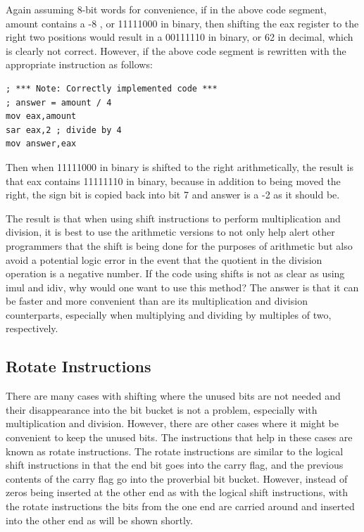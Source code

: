 \documentclass[10pt]{book}
\begin{document}
Again assuming 8-bit words for convenience, if in the above code segment, amount contains a -8 , or 11111000 in binary, then shifting the eax register to the right two positions would result in a 00111110 in binary, or 62 in decimal, which is clearly not correct. However, if the above code segment is rewritten with the appropriate instruction as follows:


\begin{verbatim}
; *** Note: Correctly implemented code ***
; answer = amount / 4
mov eax,amount
sar eax,2 ; divide by 4
mov answer,eax
\end{verbatim}

Then when 11111000 in binary is shifted to the right arithmetically, the result is that eax contains 11111110 in binary, because in addition to being moved the right, the sign bit is copied back into bit 7 and answer is a -2 as it should be.

The result is that when using shift instructions to perform multiplication and division, it is best to use the arithmetic versions to not only help alert other programmers that the shift is being done for the purposes of arithmetic but also avoid a potential logic error in the event that the quotient in the division operation is a negative number. If the code using shifts is not as clear as using imul and idiv, why would one want to use this method? The answer is that it can be faster and more convenient than are its multiplication and division counterparts, especially when multiplying and dividing by multiples of two, respectively.

\subsection{Rotate Instructions}
There are many cases with shifting where the unused bits are not needed and their disappearance into the bit bucket is not a problem, especially with multiplication and division. However, there are other cases where it might be convenient to keep the unused bits. The instructions that help in these cases are known as rotate instructions. The rotate instructions are similar to the logical shift instructions in that the end bit goes into the carry flag, and the previous contents of the carry flag go into the proverbial bit bucket. However, instead of zeros being inserted at the other end as with the logical shift instructions, with the rotate instructions the bits from the one end are carried around and inserted into the other end as will be shown shortly.
\end{document}
